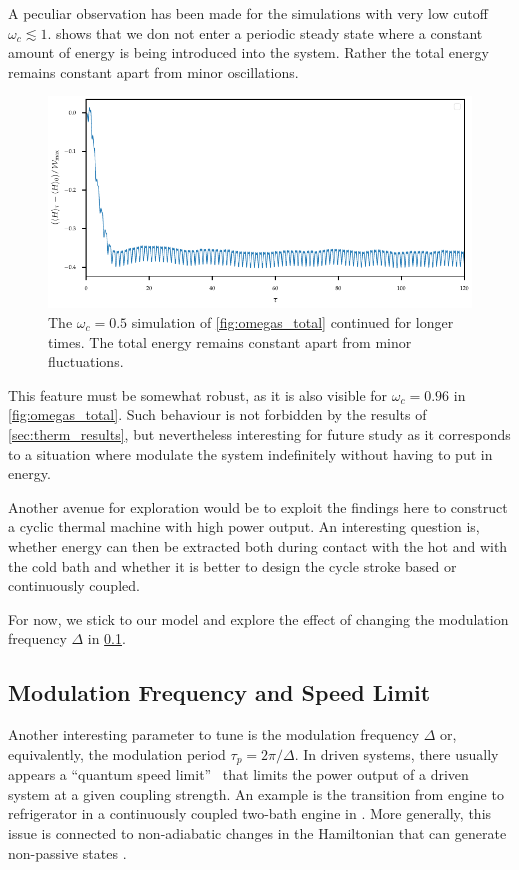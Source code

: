 A peculiar observation has been made for the simulations with very low
cutoff \(ω_{c}\lesssim 1\).  shows that we
don not enter a periodic steady state where a constant amount of
energy is being introduced into the system. Rather the total energy
remains constant apart from minor oscillations.
\begin{figure}[htp]
  \centering
  \includegraphics{figs/one_bath_mod/total_for_steady}
  \caption{\label{fig:total_for_steady} The \(ω_{c}=0.5\) simulation
    of \cref{fig:omegas_total} continued for longer times. The total
    energy remains constant apart from minor fluctuations.}
\end{figure}
This feature must be somewhat robust, as it is also visible for
\(ω_{c}=0.96\) in \cref{fig:omegas_total}. Such behaviour is not
forbidden by the results of \cref{sec:therm_results}, but nevertheless
interesting for future study as it corresponds to a situation where
modulate the system indefinitely without having to put in energy.

Another avenue for exploration would be to exploit the findings here
to construct a cyclic thermal machine with high power output. An
interesting question is, whether energy can then be extracted both
during contact with the hot and with the cold bath and whether it is
better to design the cycle stroke based or continuously coupled.

For now, we stick to our model and explore the effect of changing the
modulation frequency \(Δ\) in \cref{sec:speedlim}.

\subsection{Modulation Frequency and Speed Limit}%
\label{sec:speedlim}
Another interesting parameter to tune is the modulation frequency
\(Δ\) or, equivalently, the modulation period \(τ_{p}=2π/Δ\). In
driven systems, there usually appears a ``quantum speed
limit''~\cite{Kurizki2021Dec} that limits the power output of a driven
system at a given coupling strength. An example is the transition from
engine to refrigerator in a continuously coupled two-bath engine in
\cite{Mukherjee2020Jan}. More generally, this issue is connected to
non-adiabatic changes in the Hamiltonian that can generate non-passive
states \cite{Binder2018}.

